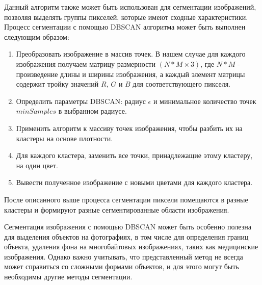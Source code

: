 \documentclass{article}
\begin{document}
Данный алгоритм также может быть использован для сегментации изображений, позволяя выделять группы пикселей, которые имеют сходные характеристики. Процесс сегментации с помощью DBSCAN алгоритма может быть выполнен следующим образом:
\begin{enumerate}
\item Преобразовать изображение в массив точек. В нашем случае для каждого изображения получаем матрицу размерности $(N*M \times 3)$, где $N*M$ - произведение длины и ширины изображения, а каждый элемент матрицы содержит тройку значений $R$, $G$ и $B$ для соответствующего пикселя.

\item Определить параметры DBSCAN: радиус $\epsilon$ и минимальное количество точек $minSamples$ в выбранном радиусе.
\item Применить алгоритм к массиву точек изображения, чтобы разбить их на кластеры на основе плотности.
\item Для каждого кластера, заменить все точки, принадлежащие этому кластеру, на один цвет.
\item Вывести полученное изображение с новыми цветами для каждого кластера.
\end{enumerate}

После описанного выше процесса сегментации пиксели помещаются в разные кластеры и формируют разные сегментированные области изображения.

Сегментация изображения с помощью DBSCAN может быть особенно полезна для выделения объектов на фотографиях, в том числе для определения границ объекта, удаления фона на многобайтовых изображениях, таких как медицинские изображения. Однако важно учитывать, что представленный метод не всегда может справиться со сложными формами объектов, и для этого могут быть необходимы другие методы сегментации.
\end{document}
